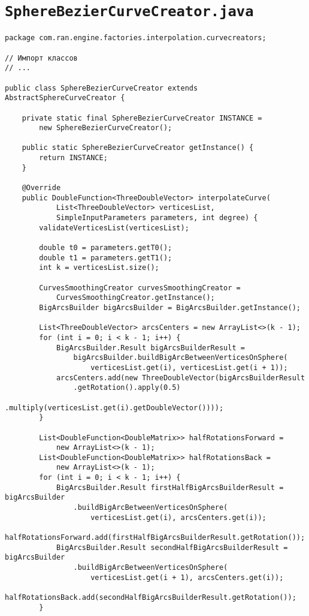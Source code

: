 \section*{\texttt{SphereBezierCurveCreator.java}}
\begin{verbatim}
package com.ran.engine.factories.interpolation.curvecreators;

// Импорт классов
// ...

public class SphereBezierCurveCreator extends AbstractSphereCurveCreator {

    private static final SphereBezierCurveCreator INSTANCE =
        new SphereBezierCurveCreator();

    public static SphereBezierCurveCreator getInstance() {
        return INSTANCE;
    }

    @Override
    public DoubleFunction<ThreeDoubleVector> interpolateCurve(
            List<ThreeDoubleVector> verticesList,
            SimpleInputParameters parameters, int degree) {
        validateVerticesList(verticesList);

        double t0 = parameters.getT0();
        double t1 = parameters.getT1();
        int k = verticesList.size();

        CurvesSmoothingCreator curvesSmoothingCreator =
            CurvesSmoothingCreator.getInstance();
        BigArcsBuilder bigArcsBuilder = BigArcsBuilder.getInstance();

        List<ThreeDoubleVector> arcsCenters = new ArrayList<>(k - 1);
        for (int i = 0; i < k - 1; i++) {
            BigArcsBuilder.Result bigArcsBuilderResult =
                bigArcsBuilder.buildBigArcBetweenVerticesOnSphere(
                    verticesList.get(i), verticesList.get(i + 1));
            arcsCenters.add(new ThreeDoubleVector(bigArcsBuilderResult
                .getRotation().apply(0.5)
                    .multiply(verticesList.get(i).getDoubleVector())));
        }

        List<DoubleFunction<DoubleMatrix>> halfRotationsForward =
            new ArrayList<>(k - 1);
        List<DoubleFunction<DoubleMatrix>> halfRotationsBack =
            new ArrayList<>(k - 1);
        for (int i = 0; i < k - 1; i++) {
            BigArcsBuilder.Result firstHalfBigArcsBuilderResult = bigArcsBuilder
                .buildBigArcBetweenVerticesOnSphere(
                    verticesList.get(i), arcsCenters.get(i));
            halfRotationsForward.add(firstHalfBigArcsBuilderResult.getRotation());
            BigArcsBuilder.Result secondHalfBigArcsBuilderResult = bigArcsBuilder
                .buildBigArcBetweenVerticesOnSphere(
                    verticesList.get(i + 1), arcsCenters.get(i));
            halfRotationsBack.add(secondHalfBigArcsBuilderResult.getRotation());
        }


\end{verbatim}
